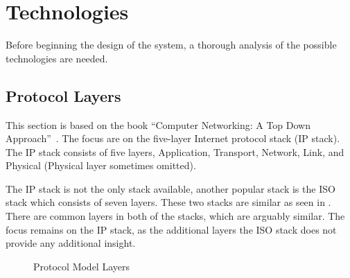 \section{Technologies}\label{sec:technologies}
Before beginning the design of the system, a thorough analysis of the possible technologies are needed. 

\subsection{Protocol Layers}\label{sec:protocol-layers}
This section is based on the book ``Computer Networking: A Top Down Approach''~\citep[Chapter 1]{computer-networking}. The focus are on the five-layer Internet protocol stack (IP stack). The IP stack consists of five layers, Application, Transport, Network, Link, and Physical (Physical layer sometimes omitted).

The IP stack is not the only stack available, another popular stack is the ISO stack which consists of seven layers. These two stacks are similar as seen in . There are common layers in both of the stacks, which are arguably similar. The focus remains on the IP stack, as the additional layers the ISO stack does not provide any additional insight.

\begin{figure}[H]
     \caption{Protocol Model Layers}
     \label{fig:protocol-layers}
\end{figure}


